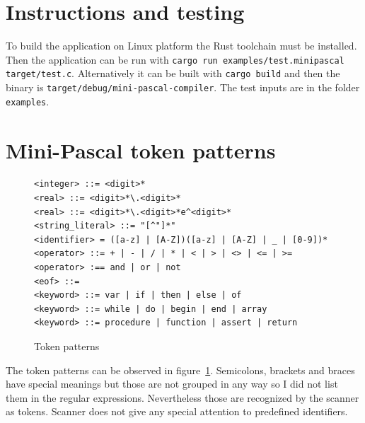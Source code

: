\documentclass[12pt,a4paper]{article}
\begin{document}
\section{Instructions and testing}

To build the application on Linux platform
the Rust toolchain must be installed. Then the application can be run with
\texttt{cargo run examples/test.minipascal target/test.c}. Alternatively
it can be built with \texttt{cargo build} and then the binary is
\texttt{target/debug/mini-pascal-compiler}. The test inputs
are in the folder \texttt{examples}.

\section{Mini-Pascal token patterns}
\begin{figure}
  \caption{Token patterns}\label{token_patterns}
\begin{verbatim}
<integer> ::= <digit>*
<real> ::= <digit>*\.<digit>*
<real> ::= <digit>*\.<digit>*e^<digit>*
<string_literal> ::= "[^"]*" 
<identifier> = ([a-z] | [A-Z])([a-z] | [A-Z] | _ | [0-9])*
<operator> ::= + | - | / | * | < | > | <> | <= | >=
<operator> :== and | or | not
<eof> ::=
<keyword> ::= var | if | then | else | of 
<keyword> ::= while | do | begin | end | array
<keyword> ::= procedure | function | assert | return
\end{verbatim}
\end{figure}

The token patterns can be observed in figure~\ref{token_patterns}.
Semicolons, brackets and braces have special meanings but those are
not grouped in any way so I did not list them in the regular expressions.
Nevertheless those are recognized by the scanner as tokens. Scanner
does not give any special attention to predefined identifiers.
\end{document}
